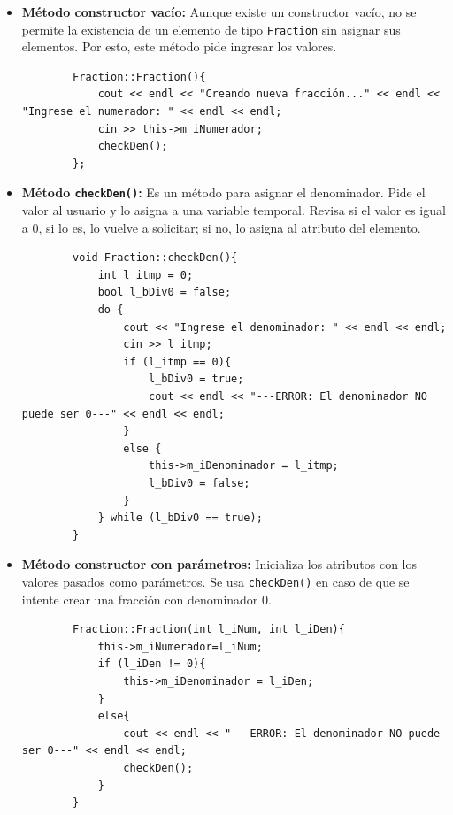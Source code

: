 \begin{itemize}
    \item \textbf{Método constructor vacío:} Aunque existe un constructor vacío, no se permite la existencia de un elemento de tipo \texttt{Fraction} sin asignar sus elementos. Por esto, este método pide ingresar los valores.
    
    
        \begin{verbatim}
        Fraction::Fraction(){
            cout << endl << "Creando nueva fracción..." << endl << "Ingrese el numerador: " << endl << endl;
            cin >> this->m_iNumerador;
            checkDen();
        };
        \end{verbatim}

    \item \textbf{Método \texttt{checkDen()}:} Es un método para asignar el denominador. Pide el valor al usuario y lo asigna a una variable temporal. Revisa si el valor es igual a 0, si lo es, lo vuelve a solicitar; si no, lo asigna al atributo del elemento.
        \begin{verbatim}
        void Fraction::checkDen(){
            int l_itmp = 0;
            bool l_bDiv0 = false;
            do {
                cout << "Ingrese el denominador: " << endl << endl;
                cin >> l_itmp;
                if (l_itmp == 0){
                    l_bDiv0 = true;
                    cout << endl << "---ERROR: El denominador NO puede ser 0---" << endl << endl;
                }
                else {
                    this->m_iDenominador = l_itmp;
                    l_bDiv0 = false;
                }
            } while (l_bDiv0 == true);
        }
        \end{verbatim}
    
    \item \textbf{Método constructor con parámetros:} Inicializa los atributos con los valores pasados como parámetros. Se usa \texttt{checkDen()} en caso de que se intente crear una fracción con denominador 0.
        \begin{verbatim}
        Fraction::Fraction(int l_iNum, int l_iDen){
            this->m_iNumerador=l_iNum;
            if (l_iDen != 0){
                this->m_iDenominador = l_iDen;
            }
            else{
                cout << endl << "---ERROR: El denominador NO puede ser 0---" << endl << endl;
                checkDen();
            }
        }
        \end{verbatim}
        

\end{itemize}
